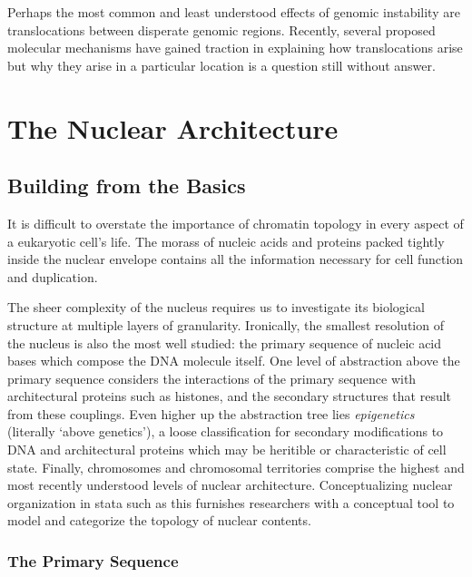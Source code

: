 \documentclass[phd,tocprelim]{cornell}
\begin{document}
Perhaps the most common and least understood effects of genomic instability are
translocations between disperate genomic regions.  Recently, several proposed
molecular mechanisms have gained traction in explaining how translocations arise
but why they arise in a particular location is a question still without answer.


\chapter{The Nuclear Architecture}

\section{Building from the Basics}

It is difficult to overstate the importance of chromatin topology in
every aspect of a eukaryotic cell's life.  The morass of nucleic acids and
proteins packed tightly inside the nuclear envelope contains all the
information necessary for cell function and duplication.

The sheer complexity of the nucleus requires us to investigate its biological
structure at multiple layers of granularity.  Ironically, the smallest resolution
of the nucleus is also the most well studied: the primary sequence of nucleic
acid bases which compose the DNA molecule itself.  One level of abstraction
above the primary sequence considers the interactions of the primary sequence
with architectural proteins such as histones, and the secondary structures that
result from these couplings.  Even higher up the abstraction tree lies
\textit{epigenetics} (literally `above genetics'\cite{dictepi2014}), a loose
classification for secondary modifications to DNA and architectural proteins
which may be heritible or characteristic of cell state.  Finally, chromosomes
and chromosomal territories comprise the highest and most recently understood
levels of nuclear architecture.  Conceptualizing nuclear organization in
stata such as this furnishes researchers with a conceptual tool to model
and categorize the topology of nuclear contents.

\subsection{The Primary Sequence}
\end{document}
